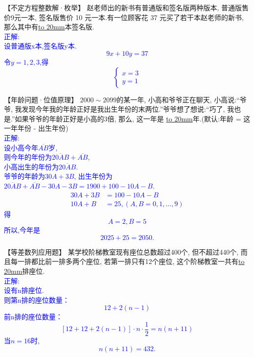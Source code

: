 \item {
    【不定方程整数解·枚举】
    赵老师出的新书有普通版和签名版两种版本, 普通版售价9元一本, 签名版售价 10 元一本.有一位顾客花 37 元买了若干本赵老师的新书, 那么其中有\underline{\hbox to 20mm{}}本签名版.
    \ifshowSolution{}
        \fangsong{}\textcolor{blue}{
            \\正解:\\
            设普通版x本,签名版y本.\\
            \[9x + 10y = 37\]
            令$y=1, 2, 3$,得
            \[\left\{\begin{array}{l}
                    x = 3 \\
                    y = 1 
            \end{array}\right.\]
        }
    \else
        \vspace{2cm}
    \fi
}

\item {
    【年龄问题·位值原理】
    $2000\sim 2099$的某一年, 小高和爷爷正在聊天, 小高说:``爷爷, 我发现今年我的年龄正好是我出生年份的末两位.''爷爷想了想说:``巧了, 我也是.''如果爷爷的年龄正好是小高的3倍, 那么, 这一年是  \underline{\hbox to 20mm{}}年.(默认:年龄 = 这一年年份 - 出生年份)
    \ifshowSolution{}
        \fangsong{}\textcolor{blue}{
            \\正解:\\
            设小高今年$\overline{AB}$岁,\\
            则今年的年份为$\overline{20AB} + \overline{AB}$, \\
            小高出生的年份为$\overline{20AB}$.\\
            爷爷的年龄为$30A + 3B$, 出生年份为
            $\overline{20AB} + \overline{AB} - 30A - 3B = 1900+100-10A-B$.
            \begin{align*}
                30A + 3B &= 100 - 10A- B \\
                10A + B &= 25, (A,B = 0,1,\ldots, 9)
            \end{align*}
            得
            \[ A=2, B=5 \]
            所以,今年是
            \[ 2025 + 25 = 2050. \]
        }
    \else
        \vspace{2cm}
    \fi
}

\item {
    【等差数列应用题】
    某学校阶梯教室现有座位总数超过400个, 但不超过440个, 而且每一排都比前一排多两个座位, 若第一排只有12个座位, 这个阶梯教室一共有\underline{\hbox to 20mm{}}排座位.
    \ifshowSolution{}
        \fangsong{}\textcolor{blue}{
            \\正解:\\
            设有n排座位.\\
            则第n排的座位数量：
            \[ 12+2(n-1) \]
            前n排的座位数量：
            \[ [12+12+2(n-1)]\cdot n \cdot \frac12 = n(n+11) \]
            当$n=16$时,
            \[ n(n+11) = 432. \]
        }
    \else
        \vspace{2cm}
    \fi
}

